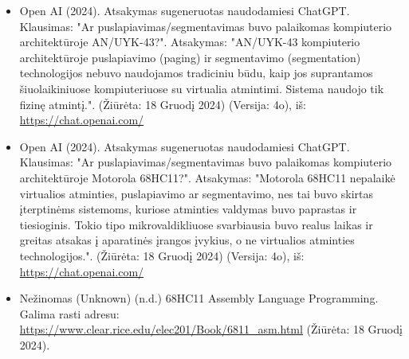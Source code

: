\documentclass[a4paper,12pt]{article}
\begin{document}
\begin{itemize}
    \item Open AI (2024). Atsakymas sugeneruotas naudodamiesi ChatGPT. Klausimas: "Ar puslapiavimas/segmentavimas buvo palaikomas kompiuterio architektūroje AN/UYK-43?". Atsakymas: "AN/UYK-43 kompiuterio architektūroje puslapiavimo (paging) ir segmentavimo (segmentation) technologijos nebuvo naudojamos tradiciniu būdu, kaip jos suprantamos šiuolaikiniuose kompiuteriuose su virtualia atmintimi. Sistema naudojo tik fizinę atmintį.". (Žiūrėta: 18 Gruodį 2024) (Versija: 4o), iš: \url{https://chat.openai.com/}
    \item Open AI (2024). Atsakymas sugeneruotas naudodamiesi ChatGPT. Klausimas: "Ar puslapiavimas/segmentavimas buvo palaikomas kompiuterio architektūroje Motorola 68HC11?". Atsakymas: "Motorola 68HC11 nepalaikė virtualios atminties, puslapiavimo ar segmentavimo, nes tai buvo skirtas įterptinėms sistemoms, kuriose atminties valdymas buvo paprastas ir tiesioginis. Tokio tipo mikrovaldikliuose svarbiausia buvo realus laikas ir greitas atsakas į aparatinės įrangos įvykius, o ne virtualios atminties technologijos.". (Žiūrėta: 18 Gruodį 2024) (Versija: 4o), iš: \url{https://chat.openai.com/}
    \item Nežinomas (Unknown) (n.d.) 68HC11 Assembly Language Programming. Galima rasti adresu: \url{https://www.clear.rice.edu/elec201/Book/6811_asm.html} (Žiūrėta: 18 Gruodį 2024).

\end{itemize}
\end{document}
